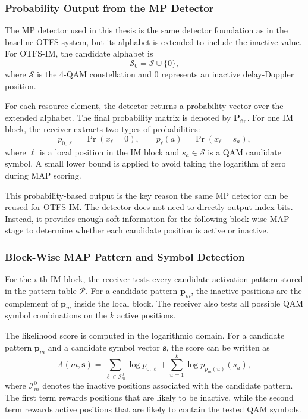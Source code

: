 \subsubsection{Probability Output from the MP Detector}

The MP detector used in this thesis is the same detector foundation as in the baseline OTFS system, but its alphabet is extended to include the inactive value. For OTFS-IM, the candidate alphabet is
\begin{equation}
    \mathcal{S}_{0}
    =
    \mathcal{S}
    \cup
    \{0\},
    \label{eq:otfs_im_extended_alphabet}
\end{equation}
where \(\mathcal{S}\) is the 4-QAM constellation and \(0\) represents an inactive delay-Doppler position.

For each resource element, the detector returns a probability vector over the extended alphabet. The final probability matrix is denoted by \(\mathbf{P}_{\mathrm{fin}}\). For one IM block, the receiver extracts two types of probabilities:
\begin{equation}
    p_{0,\ell}
    =
    \Pr(x_\ell=0),
    \qquad
    p_{\ell}(a)
    =
    \Pr(x_\ell=s_a),
    \label{eq:zero_and_symbol_probabilities}
\end{equation}
where \(\ell\) is a local position in the IM block and \(s_a\in\mathcal{S}\) is a QAM candidate symbol. A small lower bound is applied to avoid taking the logarithm of zero during MAP scoring.

This probability-based output is the key reason the same MP detector can be reused for OTFS-IM. The detector does not need to directly output index bits. Instead, it provides enough soft information for the following block-wise MAP stage to determine whether each candidate position is active or inactive.

\subsubsection{Block-Wise MAP Pattern and Symbol Detection}

For the \(i\)-th IM block, the receiver tests every candidate activation pattern stored in the pattern table \(\mathcal{P}\). For a candidate pattern \(\mathbf{p}_m\), the inactive positions are the complement of \(\mathbf{p}_m\) inside the local block. The receiver also tests all possible QAM symbol combinations on the \(k\) active positions.

The likelihood score is computed in the logarithmic domain. For a candidate pattern \(\mathbf{p}_m\) and a candidate symbol vector \(\mathbf{s}\), the score can be written as
\begin{equation}
    \Lambda(m,\mathbf{s})
    =
    \sum_{\ell \in \mathcal{I}_m^{0}}
    \log p_{0,\ell}
    +
    \sum_{u=1}^{k}
    \log p_{p_m(u)}(s_u),
    \label{eq:block_map_score}
\end{equation}
where \(\mathcal{I}_m^{0}\) denotes the inactive positions associated with the candidate pattern. The first term rewards positions that are likely to be inactive, while the second term rewards active positions that are likely to contain the tested QAM symbols.

